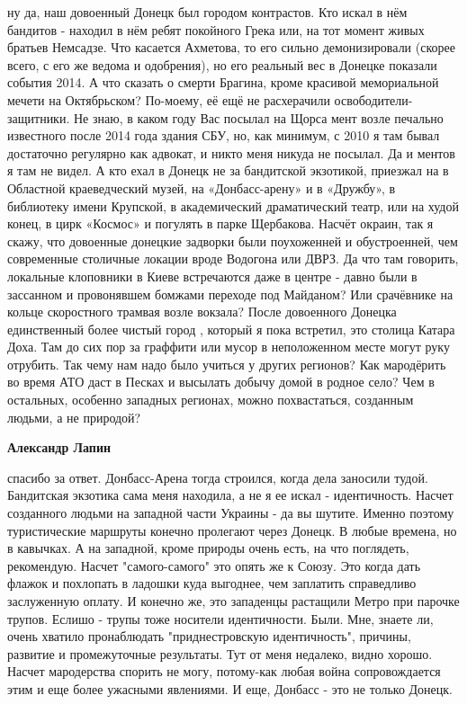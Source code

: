 \begin{itemize}
\begin{itemize}
ну да, наш довоенный Донецк был городом контрастов. Кто искал в нём бандитов -
находил в нём ребят покойного Грека или, на тот момент живых братьев Немсадзе.
Что касается Ахметова, то его сильно демонизировали (скорее всего, с его же
ведома и одобрения), но его реальный вес в Донецке показали события 2014. А что
сказать о смерти Брагина, кроме красивой мемориальной мечети на Октябрьском?
По-моему, её ещё не расхерачили освободители-защитники. Не знаю, в каком году
Вас посылал на Щорса мент возле печально известного после 2014 года здания СБУ,
но, как минимум, с 2010 я там бывал достаточно регулярно как адвокат, и никто
меня никуда не посылал. Да и ментов я там не видел. А кто ехал в Донецк не за
бандитской экзотикой, приезжал на в Областной краеведческий музей, на
«Донбасс-арену» и в «Дружбу», в библиотеку имени Крупской, в академический
драматический театр, или на худой конец, в цирк «Космос» и погулять в парке
Щербакова. Насчёт окраин, так я скажу, что довоенные донецкие задворки были
поухоженней и обустроенней, чем современные столичные локации вроде Водогона
или ДВРЗ. Да что там говорить, локальные клоповники в Киеве встречаются даже в
центре - давно были в зассанном и провонявшем бомжами переходе под Майданом?
Или срачёвнике на кольце скоростного трамвая возле вокзала? После довоенного
Донецка единственный более чистый город , который я пока встретил, это столица
Катара Доха. Там до сих пор за граффити или мусор в неположенном месте могут
руку отрубить. Так чему нам надо было учиться у других регионов? Как мародёрить
во время АТО даст в Песках и высылать добычу домой в родное село? Чем в
остальных, особенно западных регионах, можно похвастаться, созданным людьми, а
не природой?

\textbf{Александр Лапин} 

спасибо за ответ. Донбасс-Арена тогда строился, когда дела заносили тудой.
Бандитская экзотика сама меня находила, а не я ее искал - идентичность. Насчет
созданного людьми на западной части Украины - да вы шутите. Именно поэтому
туристические маршруты конечно пролегают через Донецк. В любые времена, но в
кавычках. А на западной, кроме природы очень есть, на что поглядеть,
рекомендую. Насчет "самого-самого" это опять же к Союзу. Это когда дать флажок
и похлопать в ладошки куда выгоднее, чем заплатить справедливо заслуженную
оплату. И конечно же, это западенцы растащили Метро при парочке трупов. Еслишо
- трупы тоже носители идентичности. Были. Мне, знаете ли, очень хватило
пронаблюдать "приднестровскую идентичность", причины, развитие и промежуточные
результаты. Тут от меня недалеко, видно хорошо. Насчет мародерства спорить не
могу, потому-как любая война сопровождается этим и еще более ужасными
явлениями. И еще, Донбасс - это не только Донецк.


\end{itemize}
\end{itemize}
